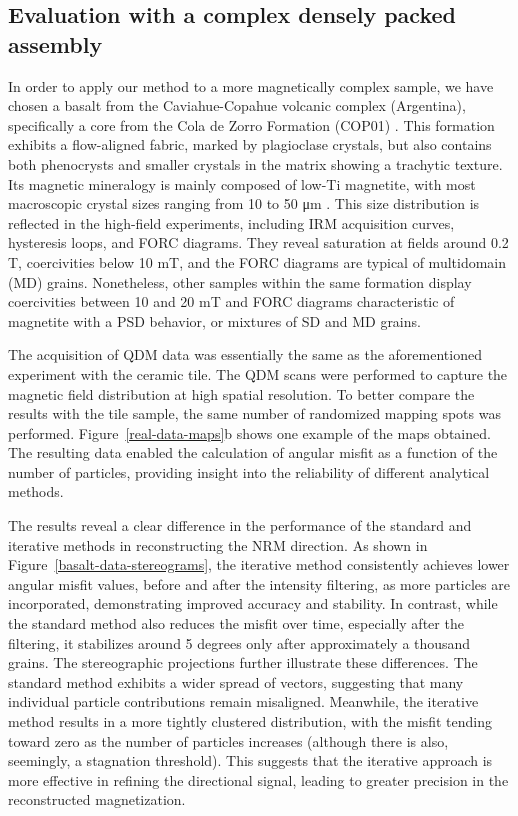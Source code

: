 \subsection{Evaluation with a complex densely packed assembly}

In order to apply our method to a more magnetically complex sample, we have chosen a basalt from the Caviahue-Copahue volcanic complex (Argentina), specifically a core from the Cola de Zorro Formation (COP01) \citep{Moncinhatto2019}. This formation exhibits a flow-aligned fabric, marked by plagioclase crystals, but also contains both phenocrysts and smaller crystals in the matrix showing a trachytic texture. Its magnetic mineralogy is mainly composed of low-Ti magnetite, with most macroscopic crystal sizes ranging from 10 to 50 \si{\micro\meter} \citep{Moncinhatto2019}. This size distribution is reflected in the high-field experiments, including IRM acquisition curves, hysteresis loops, and FORC diagrams. They reveal saturation at fields around 0.2 \si{T}, coercivities below 10 \si{mT}, and the FORC diagrams are typical of multidomain (MD) grains. Nonetheless, other samples within the same formation display coercivities between 10 and 20 \si{mT} and FORC diagrams characteristic of magnetite with a PSD behavior, or mixtures of SD and MD grains.

The acquisition of QDM data was essentially the same as the aforementioned experiment with the ceramic tile. The QDM scans were performed to capture the magnetic field distribution at high spatial resolution. To better compare the results with the tile sample, the same number of randomized mapping spots was performed. Figure~\ref{real-data-maps}b shows one example of the maps obtained. The resulting data enabled the calculation of angular misfit as a function of the number of particles, providing insight into the reliability of different analytical methods.

The results reveal a clear difference in the performance of the standard and iterative methods in reconstructing the NRM direction. As shown in Figure~\ref{basalt-data-stereograms}, the iterative method consistently achieves lower angular misfit values, before and after the intensity filtering, as more particles are incorporated, demonstrating improved accuracy and stability. In contrast, while the standard method also reduces the misfit over time, especially after the filtering, it stabilizes around 5 degrees only after approximately a thousand grains. The stereographic projections further illustrate these differences. The standard method exhibits a wider spread of vectors, suggesting that many individual particle contributions remain misaligned. Meanwhile, the iterative method results in a more tightly clustered distribution, with the misfit tending toward zero as the number of particles increases (although there is also, seemingly, a stagnation threshold). This suggests that the iterative approach is more effective in refining the directional signal, leading to greater precision in the reconstructed magnetization. 

